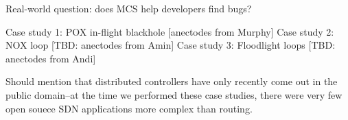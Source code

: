 Real-world question: does MCS help developers find bugs?

\begin{outline}
\1 Case study 1: POX in-flight blackhole [anectodes from Murphy]
\1 Case study 2: NOX loop [TBD: anectodes from Amin]
\1 Case study 3: Floodlight loops [TBD: anectodes from Andi]
\end{outline}

Should mention that distributed controllers have only recently come out in the
public domain--at the time we performed these case studies, there were very
few open souece SDN applications more complex than routing.
